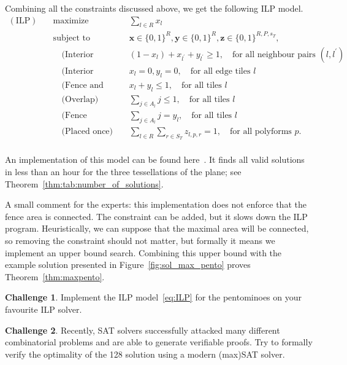 \documentclass{amsart}
\theoremstyle{definition}
\newtheorem{challenge}{Challenge}
\theoremstyle{remark}
\begin{document}
	Combining all the constraints discussed above, we get the following ILP model.
	\begin{equation}\label{eq:ILP}
		\begin{aligned}
			(\mathrm{ILP}) \quad
			& \text{maximize}   &&  \sum_{l\in R} x_l\\
			& \text{subject to} && \mathbf{x} \in \{0,1\}^{R}, \mathbf{y} \in \{0,1\}^{R}, \mathbf{z} \in \{0,1\}^{R, P, s_T}, \\
			& \quad\text{(Interior Spread)} &&  (1 - x_l) + x_{l^\prime} + y_{l^\prime} \geq 1,\quad \text {for all neighbour pairs } (l, l^\prime)\\
			& \quad\text{(Interior contained)} &&  x_l = 0, y_l = 0,\quad \text {for all edge tiles } l\\
			& \quad\text{(Fence and Interior)} &&  x_l + y_l \leq 1,\quad \text {for all tiles } l\\
			& \quad\text{(Overlap)} &&  \sum_{j \in A_l} j \leq 1,\quad \text {for all tiles } l\\
			& \quad\text{(Fence Implication)} &&  \sum_{j \in A_l} j = y_l,\quad \text {for all tiles } l\\
			& \quad\text{(Placed once)} &&  \sum_{l\in R} \sum_{r\in S_T} z_{l, p, r} = 1,\quad \text {for all polyforms } p.\\
		\end{aligned}
	\end{equation}
	
	An implementation of this model can be found here~\cite{LRMRgithub}.  It finds all valid solutions in less than an hour for the three tessellations of the plane; see Theorem~\ref{thm:tab:number_of_solutions}.
	
	
	 A small comment for the experts: this implementation does not enforce that the fence area is connected. The constraint can be added, but it slows down the ILP program. Heuristically, we can suppose that the maximal area will be connected, so removing the constraint should not matter, but formally it means we implement an upper bound search. Combining this upper bound with the example solution presented in Figure~\ref{fig:sol_max_pento} proves Theorem~\ref{thm:maxpento}.
	\begin{challenge}
		Implement the ILP model~\eqref{eq:ILP} for the pentominoes on your favourite ILP solver.
	\end{challenge}
	
	\begin{challenge}
		Recently, SAT solvers successfully attacked many different combinatorial problems and are able to generate verifiable proofs. Try to formally verify the optimality of the 128 solution using a modern (max)SAT solver.
	\end{challenge}
	
\end{document}
